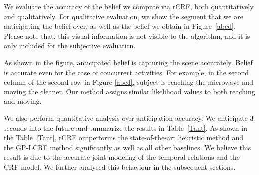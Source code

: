 We evaluate the accuracy of the belief we compute via rCRF, both quantitatively and qualitatively. For qualitative evaluation, we show the segment that we are anticipating the belief over, as well as the belief we obtain in Figure~\ref{abcd}. Please note that, this visual information is not visible to the algorithm, and it is only included for the subjective evaluation.

As shown in the figure, anticipated belief is capturing the scene accurately. Belief is accurate even for the case of concurrent activities. For example, in the second column of the second row in Figure \ref{abcd}, subject is reaching the microwave and moving the cleaner. Our method assigns similar likelihood values to both reaching and moving.

We also perform quantitative analysis over anticipation accuracy. We anticipate 3 seconds into the future and summarize the results in Table~\ref{Tant}. As shown in the Table~\ref{Tant}, rCRF outperforms the state-of-the-art heuristic method \cite{hemaAnt} and the GP-LCRF method \cite{gpcrf} significantly as well as all other baselines. We believe this result is due to the accurate joint-modeling of the temporal relations and the CRF model. We further analysed this behaviour in the subsequent sections.


